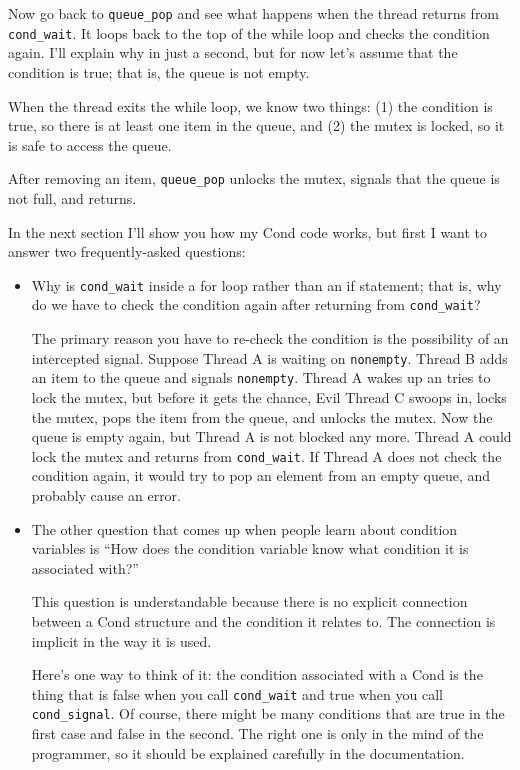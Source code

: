 \documentclass[12pt]{book}
\begin{document}
Now go back to \verb"queue_pop" and see what happens when the thread
returns from \verb"cond_wait".  It loops back to the top of the while
loop and checks the condition again.  I'll explain why in just a
second, but for now let's assume that the condition is true; that is,
the queue is not empty.

When the thread exits the while loop, we know two things: (1) the condition
is true, so there is at least one item in the queue, and (2) the mutex
is locked, so it is safe to access the queue.

After removing an item, \verb"queue_pop" unlocks the mutex, signals
that the queue is not full, and returns.

In the next section I'll show you how my Cond code works, but first I
want to answer two frequently-asked questions:

\begin{itemize}

\item Why is \verb"cond_wait" inside a for loop rather than an if
statement; that is, why do we have to check the condition again after
returning from \verb"cond_wait"?

The primary reason you have to re-check the condition is the possibility
of an intercepted signal.  Suppose Thread A is waiting on {\tt nonempty}.
Thread B adds an item to the queue and signals {\tt nonempty}.  Thread
A wakes up an tries to lock the mutex, but before it gets the chance,
Evil Thread C swoops in, locks the mutex, pops the item from the
queue, and unlocks the mutex.  Now the queue is empty again, but
Thread A is not blocked any more.  Thread A could lock the mutex and
returns from \verb"cond_wait".  If Thread A does not check the condition
again, it would try to pop an element from an empty queue, and probably
cause an error.

\item The other question that comes up when people learn about condition
variables is ``How does the condition variable know what condition it
is associated with?''

This question is understandable because there is no explicit connection
between a Cond structure and the condition it relates to.  The
connection is implicit in the way it is used.

Here's one way to think of it: the condition associated with a Cond
is the thing that is false when you call \verb"cond_wait" and true
when you call \verb"cond_signal".  Of course, there might be many
conditions that are true in the first case and false in the second.
The right one is only in the mind of the programmer, so it should be
explained carefully in the documentation.

\end{itemize}
\end{document}
